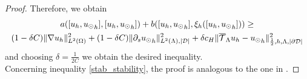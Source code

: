 \begin{proof}
Therefore, we obtain
\begin{multline*}
a([u_h, {u_{\odot}}_h],[u_h, {u_{\odot}}_h] ) + b([u_h, {u_{\odot}}_h], \xi_h([u_h, {u_{\odot}}_h]))
\geq \\
(1-\delta C) \|\nabla u_h\|^2_{L^2(\Omega)} + (1- \delta C) \|\partial_s {u_{\odot}}_h\|^2_{L^2(\Lambda), |\mathcal{D}|}
+\delta c_H  \|{\overline{\mathcal{T}}_\Lambda} u_h-{u_{\odot}}_h\|^2_{\frac 12,h,\Lambda, |\partial\mathcal{D}|}
\end{multline*}
and choosing $\delta=\frac{1}{2C}$ we obtain the desired inequality.\\
Concerning inequality \eqref{stab_stability}, the proof is analogous to the one in \cite{burman2014}.
\end{proof}

